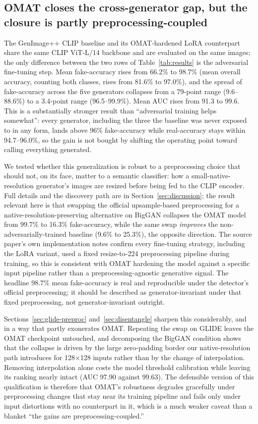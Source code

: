 \documentclass[3p,times,procedia]{elsarticle}
\begin{document}
\subsection{OMAT closes the cross-generator gap, but the closure is
partly preprocessing-coupled}
\label{sec:finding2}

The GenImage++ CLIP baseline and its OMAT-hardened LoRA counterpart share
the same CLIP ViT-L/14 backbone and are evaluated on the same images; the
only difference between the two rows of Table~\ref{tab:results} is the
adversarial fine-tuning step. Mean fake-accuracy rises from 66.2\% to
98.7\% (mean overall accuracy, counting both classes, rises from 81.6\% to
97.0\%), and the spread of fake-accuracy across the five generators
collapses from a 79-point range (9.6--88.6\%) to a 3.4-point range
(96.5--99.9\%). Mean AUC rises from 91.3 to 99.6. This is a substantially
stronger result than ``adversarial training helps somewhat'': every
generator, including the three the baseline was never exposed to in any
form, lands above 96\% fake-accuracy while real-accuracy stays within
94.7--96.0\%, so the gain is not bought by shifting the operating point
toward calling everything generated.

We tested whether this generalization is robust to a preprocessing choice
that should not, on its face, matter to a semantic classifier: how a
small-native-resolution generator's images are resized before being fed to
the CLIP encoder. Full details and the discovery path are in
Section~\ref{sec:discussion}; the result relevant here is that swapping the
official upsample-based preprocessing for a native-resolution-preserving
alternative on BigGAN collapses the OMAT model from 99.7\% to 16.3\%
fake-accuracy, while the same swap \emph{improves} the non-adversarially-trained
baseline (9.6\% to 25.3\%), the opposite direction. The source paper's
own implementation notes confirm every fine-tuning strategy, including the
LoRA variant, used a fixed resize-to-224 preprocessing pipeline during
training, so this is consistent with OMAT hardening the model against a
specific input pipeline rather than a preprocessing-agnostic generative
signal. The headline 98.7\% mean fake-accuracy is real and reproducible
under the detector's official preprocessing; it should be described as
generator-invariant under that fixed preprocessing, not generator-invariant
outright.

Sections~\ref{sec:glide-preproc} and~\ref{sec:disentangle} sharpen this
considerably, and in a way that partly exonerates OMAT. Repeating the swap
on GLIDE leaves the OMAT checkpoint untouched, and decomposing the BigGAN
condition shows that the collapse is driven by the large zero-padding
border our native-resolution path introduces for 128$\times$128 inputs
rather than by the change of interpolation. Removing interpolation alone
costs the model threshold calibration while leaving its ranking nearly
intact (AUC 97.90 against 99.63). The defensible version of this
qualification is therefore that OMAT's robustness degrades gracefully under
preprocessing changes that stay near its training pipeline and fails only
under input distortions with no counterpart in it, which is a much weaker
caveat than a blanket ``the gains are preprocessing-coupled.''
\end{document}
